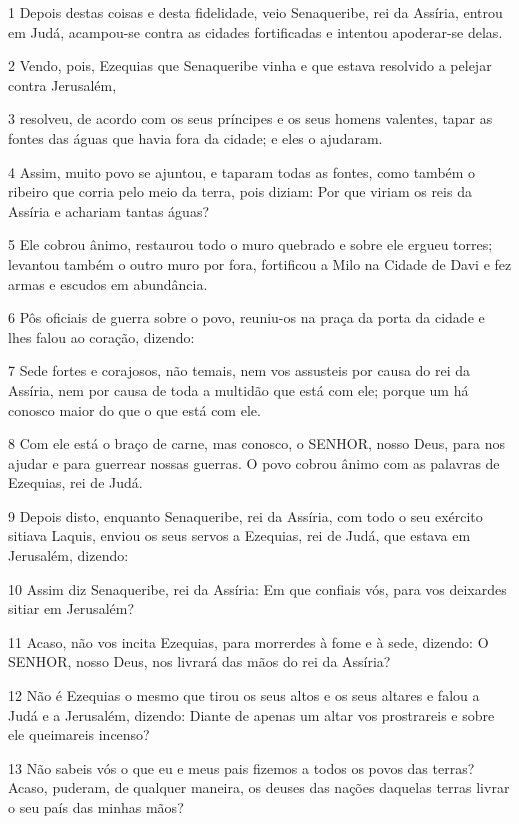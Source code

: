 \par 1 Depois destas coisas e desta fidelidade, veio Senaqueribe, rei da Assíria, entrou em Judá, acampou-se contra as cidades fortificadas e intentou apoderar-se delas.
\par 2 Vendo, pois, Ezequias que Senaqueribe vinha e que estava resolvido a pelejar contra Jerusalém,
\par 3 resolveu, de acordo com os seus príncipes e os seus homens valentes, tapar as fontes das águas que havia fora da cidade; e eles o ajudaram.
\par 4 Assim, muito povo se ajuntou, e taparam todas as fontes, como também o ribeiro que corria pelo meio da terra, pois diziam: Por que viriam os reis da Assíria e achariam tantas águas?
\par 5 Ele cobrou ânimo, restaurou todo o muro quebrado e sobre ele ergueu torres; levantou também o outro muro por fora, fortificou a Milo na Cidade de Davi e fez armas e escudos em abundância.
\par 6 Pôs oficiais de guerra sobre o povo, reuniu-os na praça da porta da cidade e lhes falou ao coração, dizendo:
\par 7 Sede fortes e corajosos, não temais, nem vos assusteis por causa do rei da Assíria, nem por causa de toda a multidão que está com ele; porque um há conosco maior do que o que está com ele.
\par 8 Com ele está o braço de carne, mas conosco, o SENHOR, nosso Deus, para nos ajudar e para guerrear nossas guerras. O povo cobrou ânimo com as palavras de Ezequias, rei de Judá.
\par 9 Depois disto, enquanto Senaqueribe, rei da Assíria, com todo o seu exército sitiava Laquis, enviou os seus servos a Ezequias, rei de Judá, que estava em Jerusalém, dizendo:
\par 10 Assim diz Senaqueribe, rei da Assíria: Em que confiais vós, para vos deixardes sitiar em Jerusalém?
\par 11 Acaso, não vos incita Ezequias, para morrerdes à fome e à sede, dizendo: O SENHOR, nosso Deus, nos livrará das mãos do rei da Assíria?
\par 12 Não é Ezequias o mesmo que tirou os seus altos e os seus altares e falou a Judá e a Jerusalém, dizendo: Diante de apenas um altar vos prostrareis e sobre ele queimareis incenso?
\par 13 Não sabeis vós o que eu e meus pais fizemos a todos os povos das terras? Acaso, puderam, de qualquer maneira, os deuses das nações daquelas terras livrar o seu país das minhas mãos?
